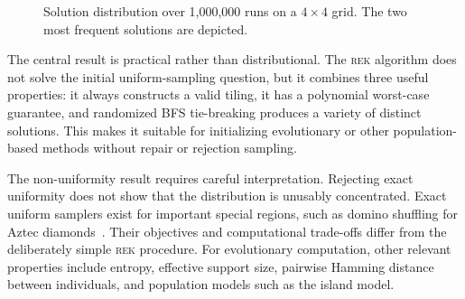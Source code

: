 \documentclass[svgnames,table,runningheads]{llncs}
\newcommand{\rek}{\textsc{rek}\xspace}
\begin{document}
\begin{figure}[t]
  \caption{Solution distribution over 1,000,000 runs on a \(4\times4\) grid. The two most frequent solutions are depicted.}\label{fig:notuniform}
\end{figure}

The central result is practical rather than distributional. The \rek algorithm does not solve the initial uniform-sampling question, but it combines three useful properties: it always constructs a valid tiling, it has a polynomial worst-case guarantee, and randomized BFS tie-breaking produces a variety of distinct solutions. This makes it suitable for initializing evolutionary or other population-based methods without repair or rejection sampling.

The non-uniformity result requires careful interpretation. Rejecting exact uniformity does not show that the distribution is unusably concentrated. Exact uniform samplers exist for important special regions, such as domino shuffling for Aztec diamonds~\cite{fusy2016random,nordenstam2008shuffling}. Their objectives and computational trade-offs differ from the deliberately simple \rek procedure. For evolutionary computation, other relevant properties include entropy, effective support size, pairwise Hamming distance between individuals, and population models such as the island model. 
\end{document}
